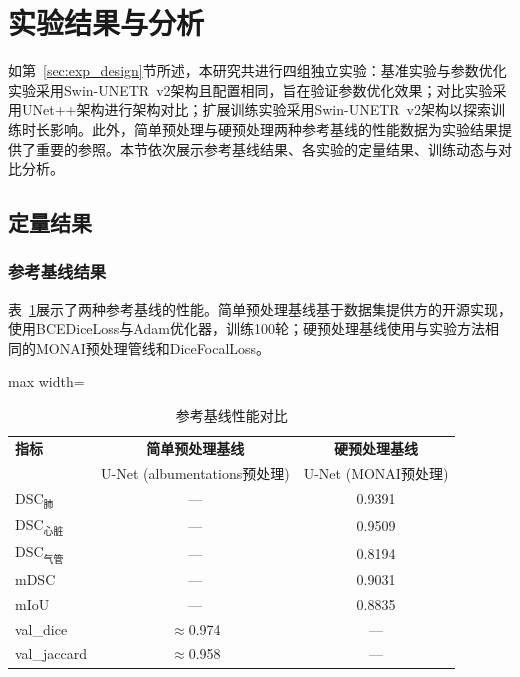\documentclass[12pt, a4paper]{article}
\begin{document}
\section{实验结果与分析}
\label{sec:results}

如第~\ref{sec:exp_design}节所述，本研究共进行四组独立实验：基准实验与参数优化实验采用Swin-UNETR~v2架构且配置相同，旨在验证参数优化效果；对比实验采用UNet++架构进行架构对比；扩展训练实验采用Swin-UNETR~v2架构以探索训练时长影响。此外，简单预处理与硬预处理两种参考基线的性能数据为实验结果提供了重要的参照。本节依次展示参考基线结果、各实验的定量结果、训练动态与对比分析。

\subsection{定量结果}
\label{sec:quantitative}

\subsubsection{参考基线结果}

表~\ref{tab:results_baseline}展示了两种参考基线的性能。简单预处理基线基于数据集提供方的开源实现，使用BCEDiceLoss与Adam优化器，训练100轮；硬预处理基线使用与实验方法相同的MONAI预处理管线和DiceFocalLoss。

\begin{table}[H]
    \centering
    \caption{参考基线性能对比}
    \label{tab:results_baseline}
    \begin{adjustbox}{max width=\textwidth}
    \begin{tabular}{@{}lcc@{}}
        \toprule
        \textbf{指标} & \textbf{简单预处理基线} & \textbf{硬预处理基线} \\
        & U-Net (albumentations预处理) & U-Net (MONAI预处理) \\
        \midrule
        DSC$_\text{肺}$ & --- & 0.9391 \\
        DSC$_\text{心脏}$ & --- & 0.9509 \\
        DSC$_\text{气管}$ & --- & 0.8194 \\
        mDSC & --- & 0.9031 \\
        mIoU & --- & 0.8835 \\
        val\_dice & $\approx$0.974 & --- \\
        val\_jaccard & $\approx$0.958 & --- \\
        \bottomrule
    \end{tabular}
    \end{adjustbox}
\end{table}
\end{document}
